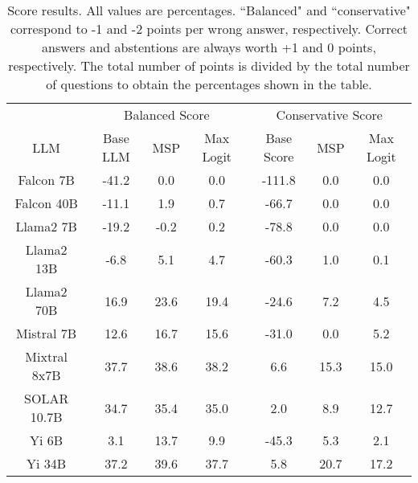 \renewcommand\arraystretch{1.2}
\begin{table*}
\centering
\begin{tabular}{c|c|c|c|c|c|c}
& \multicolumn{3}{c|}{Balanced Score} & \multicolumn{3}{c}{Conservative Score} \\ 
LLM & Base LLM & MSP & Max Logit & Base Score & MSP & Max Logit\\ \hline
Falcon 7B & -41.2 & 0.0 & 0.0 & -111.8 & 0.0 & 0.0\\
Falcon 40B & -11.1 & 1.9 & 0.7 & -66.7 & 0.0 & 0.0\\
Llama2 7B & -19.2 & -0.2 & 0.2 & -78.8 & 0.0 & 0.0\\
Llama2 13B & -6.8 & 5.1 & 4.7 & -60.3 & 1.0 & 0.1\\
Llama2 70B & 16.9 & 23.6 & 19.4 & -24.6 & 7.2 & 4.5\\
Mistral 7B & 12.6 & 16.7 & 15.6 & -31.0 & 0.0 & 5.2\\
Mixtral 8x7B & 37.7 & 38.6 & 38.2 & 6.6 & 15.3 & 15.0\\
SOLAR 10.7B & 34.7 & 35.4 & 35.0 & 2.0 & 8.9 & 12.7\\
Yi 6B & 3.1 & 13.7 & 9.9 & -45.3 & 5.3 & 2.1\\
Yi 34B & 37.2 & 39.6 & 37.7 & 5.8 & 20.7 & 17.2\\
\hline
\end{tabular}
\caption{Score results. All values are percentages. ``Balanced" and ``conservative" correspond to -1 and -2 points per wrong answer, respectively. Correct answers and abstentions are always worth +1 and 0 points, respectively. The total number of points is divided by the total number of questions to obtain the percentages shown in the table.}
\label{tab:score}
\end{table*}
